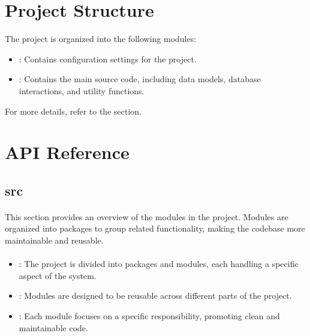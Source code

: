 \documentclass[letterpaper,10pt,english]{sphinxmanual}
\begin{document}
\chapter{Project Structure}
\label{\detokenize{index:project-structure}}
\sphinxAtStartPar
The project is organized into the following modules:
\begin{itemize}
\item {} 
\sphinxAtStartPar
{}: Contains configuration settings for the project.

\item {} 
\sphinxAtStartPar
{}: Contains the main source code, including data models, database interactions, and utility functions.

\end{itemize}

\sphinxAtStartPar
For more details, refer to the {\hyperref[\detokenize{modules:modules}]{}} section.


\chapter{API Reference}
\label{\detokenize{index:api-reference}}
\sphinxstepscope


\section{src}
\label{\detokenize{modules:src}}\label{\detokenize{modules:modules}}\label{\detokenize{modules::doc}}\subsubsection*{}

\sphinxAtStartPar
This section provides an overview of the modules in the project. Modules are organized into packages to group related functionality, making the codebase more maintainable and reusable.
\subsubsection*{}
\begin{itemize}
\item {} 
\sphinxAtStartPar
{}: The project is divided into packages and modules, each handling a specific aspect of the system.

\item {} 
\sphinxAtStartPar
{}: Modules are designed to be reusable across different parts of the project.

\item {} 
\sphinxAtStartPar
{}: Each module focuses on a specific responsibility, promoting clean and maintainable code.

\end{itemize}
\end{document}
